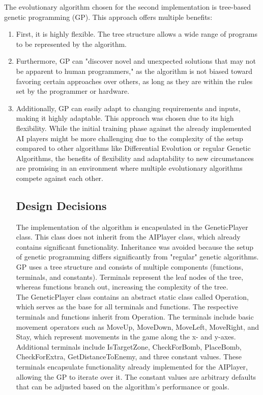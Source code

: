 \documentclass[sigconf]{acmart} %
\begin{document}
The evolutionary algorithm chosen for the second implementation is tree-based genetic programming (GP). This approach offers multiple benefits: 

\begin{enumerate}
	\item First, it is highly flexible. The tree structure allows a wide range of programs to be represented by the algorithm. 
 	\item Furthermore, GP can "discover novel and unexpected solutions that may not be apparent to human programmers," as the algorithm is not biased toward favoring certain approaches over others, as long as they are within the rules set by the programmer or hardware.
  	\item Additionally, GP can easily adapt to changing requirements and inputs, making it highly adaptable.
This approach was chosen due to its high flexibility. While the initial training phase against the already implemented AI players might be more challenging due to the complexity of the setup compared to other algorithms like Differential Evolution or regular Genetic Algorithms, the benefits of flexibility and adaptability to new circumstances are promising in an environment where multiple evolutionary algorithms compete against each other. 

\subsection{Design Decisions}

The implementation of the algorithm is encapsulated in the GeneticPlayer class. This class does not inherit from the AIPlayer class, which already contains significant functionality. Inheritance was avoided because the setup of genetic programming differs significantly from "regular" genetic algorithms. GP uses a tree structure and consists of multiple components (functions, terminals, and constants). Terminals represent the leaf nodes of the tree, whereas functions branch out, increasing the complexity of the tree. \\ 
The GeneticPlayer class contains an abstract static class called Operation, which serves as the base for all terminals and functions. The respective terminals and functions inherit from Operation. The terminals include basic movement operators such as MoveUp, MoveDown, MoveLeft, MoveRight, and Stay, which represent movements in the game along the x- and y-axes. Additional terminals include IsTargetZone, CheckForBomb, PlaceBomb, CheckForExtra, GetDistanceToEnemy, and three constant values. These terminals encapsulate functionality already implemented for the AIPlayer, allowing the GP to iterate over it. The constant values are arbitrary defaults that can be adjusted based on the algorithm's performance or goals.


\end{enumerate}
\end{document}
